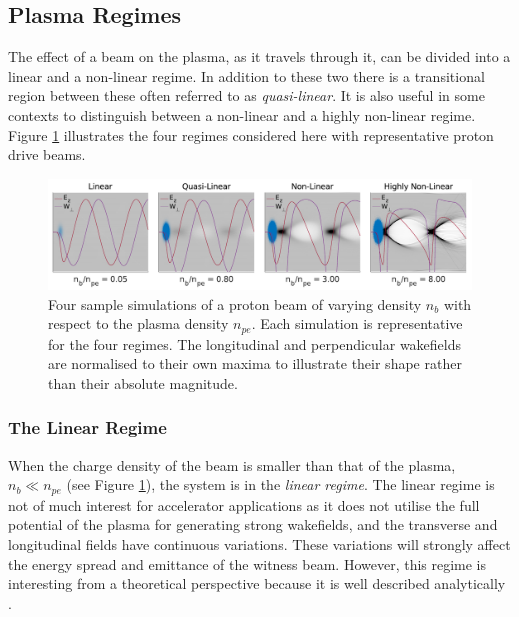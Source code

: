 \subsection{Plasma Regimes}
\label{Int:BPI:Reg}

The effect of a beam on the plasma, as it travels through it, can be divided into a linear and a non-linear regime. In addition to these two there is a transitional region between these often referred to as \textit{quasi-linear}. It is also useful in some contexts to distinguish between a non-linear and a highly non-linear regime. Figure \ref{Fig:BPI:Regime} illustrates the four regimes considered here with representative proton drive beams.

\begin{figure}[hbt]
    \centering
    \includegraphics[width=1.0\linewidth,trim={0mm 0mm 0mm 0mm},clip]{figures/Regimes}
    \caption{\label{Fig:BPI:Regime} Four sample simulations of a proton beam of varying density $n_{b}$ with respect to the plasma density $n_{pe}$. Each simulation is representative for the four regimes. The longitudinal and perpendicular wakefields are normalised to their own maxima to illustrate their shape rather than their absolute magnitude.}
\end{figure}

\subsubsection{The Linear Regime}
\label{Int:BPI:Lin}

When the charge density of the beam is smaller than that of the plasma, $n_{b} \ll n_{pe}$ (see Figure \ref{Fig:BPI:Regime}), the system is in the \textit{linear regime}. The linear regime is not of much interest for accelerator applications as it does not utilise the full potential of the plasma for generating strong wakefields, and the transverse and longitudinal fields have continuous variations. These variations will strongly affect the energy spread and emittance of the witness beam. However, this regime is interesting from a theoretical perspective because it is well described analytically \cite{muggli:2017}.

